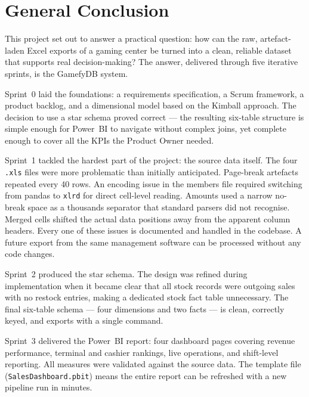 \chapter*{General Conclusion}

This project set out to answer a practical question: how can the raw, artefact-laden
Excel exports of a gaming center be turned into a clean, reliable dataset that supports
real decision-making? The answer, delivered through five iterative sprints, is the
GamefyDB system.

Sprint~0 laid the foundations: a requirements specification, a Scrum framework, a
product backlog, and a dimensional model based on the Kimball approach. The decision
to use a star schema proved correct --- the resulting six-table structure is simple
enough for Power~BI to navigate without complex joins, yet complete enough to cover
all the KPIs the Product Owner needed.

Sprint~1 tackled the hardest part of the project: the source data itself. The four
\texttt{.xls} files were more problematic than initially anticipated. Page-break
artefacts repeated every 40 rows. An encoding issue in the members file required
switching from pandas to \texttt{xlrd} for direct cell-level reading. Amounts used a
narrow no-break space as a thousands separator that standard parsers did not recognise.
Merged cells shifted the actual data positions away from the apparent column headers.
Every one of these issues is documented and handled in the codebase. A future export
from the same management software can be processed without any code changes.

Sprint~2 produced the star schema. The design was refined during implementation when it
became clear that all stock records were outgoing sales with no restock entries, making
a dedicated stock fact table unnecessary. The final six-table schema --- four dimensions
and two facts --- is clean, correctly keyed, and exports with a single command.

Sprint~3 delivered the Power~BI report: four dashboard pages covering revenue
performance, terminal and cashier rankings, live operations, and shift-level reporting.
All measures were validated against the source data. The template file
(\texttt{SalesDashboard.pbit}) means the entire report can be refreshed with a new
pipeline run in minutes.

